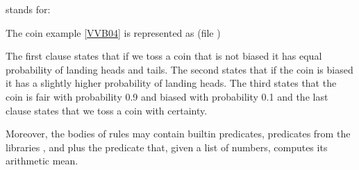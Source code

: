 \documentclass[letterpaper,10pt,english]{sphinxmanual}
\begin{document}
\sphinxAtStartPar
stands for:

\begin{sphinxVerbatim}[commandchars=\\\{\}]
  
\end{sphinxVerbatim}

\sphinxAtStartPar
The coin example {[}\hyperlink{cite.index:id46}{VVB04}{]} is represented as (file )

\begin{sphinxVerbatim}[commandchars=\\\{\}]
   

   

  

\end{sphinxVerbatim}

\sphinxAtStartPar
The first clause states that if we toss a coin that is not biased it has equal probability of landing heads and
tails.
The second states that if the coin is biased it has a slightly higher probability of landing heads.
The third states that the coin is fair with probability 0.9 and biased with probability 0.1 and the last clause
states that we toss a coin with certainty.

\sphinxAtStartPar
Moreover, the bodies of rules may contain built\sphinxhyphen{}in predicates, predicates from the libraries ,
 and  plus the predicate 
that, given a list of numbers, computes its arithmetic mean.
\end{document}
